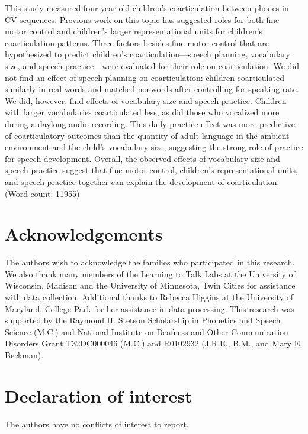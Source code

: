 \documentclass[a4paper,man,natbib,donotrepeattitle, apacite]{apa6}
\begin{document}
This study measured four-year-old children’s coarticulation between phones in CV sequences. Previous work on this topic has suggested roles for both fine motor control and children’s larger representational units for children’s coarticulation patterns. Three factors besides fine motor control that are hypothesized to predict children's coarticulation---speech planning, vocabulary size, and speech practice---were evaluated for their role on coarticulation. We did not find an effect of speech planning on coarticulation: children coarticulated similarly in real words and matched nonwords after controlling for speaking rate. We did, however, find effects of vocabulary size and speech practice. Children with larger vocabularies coarticulated less, as did those who vocalized more during a daylong audio recording. This daily practice effect was more predictive of coarticulatory outcomes than the quantity of adult language in the ambient environment and the child's vocabulary size, suggesting the strong role of practice for speech development. Overall, the observed effects of vocabulary size and speech practice suggest that fine motor control, children's representational units, and speech practice together can explain the development of coarticulation. (Word count: 11955)

\section{Acknowledgements}

The authors wish to acknowledge the families who participated in this research. We also thank many members of the Learning to Talk Labs at the University of Wisconsin, Madison and the University of Minnesota, Twin Cities for assistance with data collection. Additional thanks to Rebecca Higgins at the University of Maryland, College Park for her assistance in data processing. This research was supported by the Raymond H. Stetson Scholarship in Phonetics and Speech Science (M.C.) and National Institute on Deafness and Other Communication Disorders Grant T32DC000046 (M.C.) and R0102932 (J.R.E., B.M., and Mary E. Beckman).   

\section{Declaration of interest}

The authors have no conflicts of interest to report. 




\end{document}
